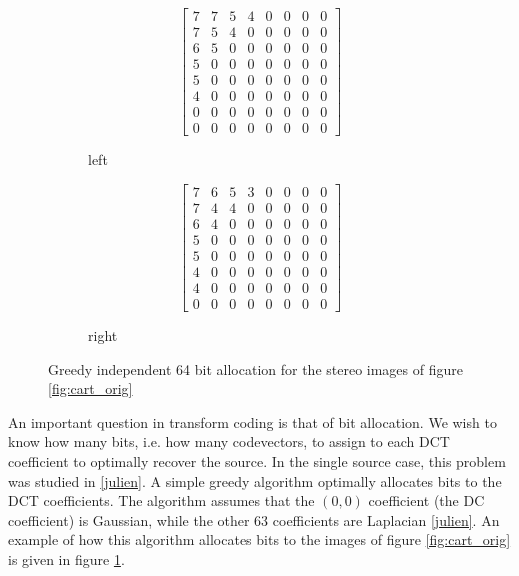 \begin{figure}
    \begin{subfigure}{0.5\textwidth}
        \begin{equation*}
            \left[
            \begin{matrix}
                7 & 7 & 5 & 4 & 0 & 0 & 0 & 0 \\
                7 & 5 & 4 & 0 & 0 & 0 & 0 & 0 \\
                6 & 5 & 0 & 0 & 0 & 0 & 0 & 0 \\
                5 & 0 & 0 & 0 & 0 & 0 & 0 & 0 \\
                5 & 0 & 0 & 0 & 0 & 0 & 0 & 0 \\
                4 & 0 & 0 & 0 & 0 & 0 & 0 & 0 \\
                0 & 0 & 0 & 0 & 0 & 0 & 0 & 0 \\
                0 & 0 & 0 & 0 & 0 & 0 & 0 & 0
            \end{matrix}
            \right]
        \end{equation*}
    \caption{left}
    \end{subfigure}%
    \begin{subfigure}{0.5\textwidth}
        \begin{equation*}
            \left[
            \begin{matrix}
                7 & 6 & 5 & 3 & 0 & 0 & 0 & 0 \\
                7 & 4 & 4 & 0 & 0 & 0 & 0 & 0 \\
                6 & 4 & 0 & 0 & 0 & 0 & 0 & 0 \\
                5 & 0 & 0 & 0 & 0 & 0 & 0 & 0 \\
                5 & 0 & 0 & 0 & 0 & 0 & 0 & 0 \\
                4 & 0 & 0 & 0 & 0 & 0 & 0 & 0 \\
                4 & 0 & 0 & 0 & 0 & 0 & 0 & 0 \\
                0 & 0 & 0 & 0 & 0 & 0 & 0 & 0
            \end{matrix}
            \right]
        \end{equation*}
    \caption{right}
    \end{subfigure}
    \caption{Greedy independent 64 bit allocation for the stereo images of figure \ref{fig:cart_orig} }
    \label{fig:cart_bit_alloc}
\end{figure}

An important question in transform coding is that of bit allocation. We wish to know how many bits, i.e. how many codevectors, to assign to each DCT coefficient to optimally recover the source. In the single source case, this problem was studied in \ref{julien}. A simple greedy algorithm optimally allocates bits to the DCT coefficients. The algorithm assumes that the $(0,0)$ coefficient (the DC coefficient) is Gaussian, while the other 63 coefficients are Laplacian \ref{julien}. An example of how this algorithm allocates bits to the images of figure \ref{fig:cart_orig} is given in figure \ref{fig:cart_bit_alloc}.\\


